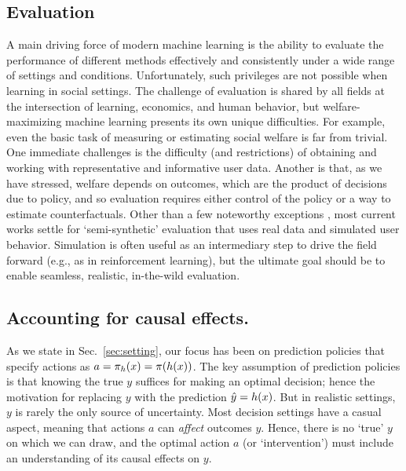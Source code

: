 \subsection{Evaluation}
A main driving force of modern machine learning is the ability to evaluate the performance of different methods effectively and consistently under a wide range of settings and conditions.
Unfortunately, such privileges are not possible when 
learning in social settings.
The challenge of evaluation is shared by all fields at the intersection of learning, economics, and human behavior,
but welfare-maximizing machine learning presents its own unique difficulties.
For example, even the basic task of measuring or estimating social welfare is far from trivial. %
One immediate challenges is the difficulty (and restrictions) of obtaining and working with representative and informative user data.
Another is that, as we have stressed, welfare depends on outcomes, which are the product of decisions due to policy,
and so evaluation requires either control of the policy or a way to estimate counterfactuals.
Other than a few noteworthy exceptions \citep[e.g.,][]{bjorkegren2020manipulation,haupt2023recommending,mendler-dunner2024an},
most current works settle for `semi-synthetic' evaluation that uses real data and simulated user behavior.
Simulation is often useful as an intermediary step to drive the field forward (e.g., as in reinforcement learning),
but the ultimate goal should be to enable seamless, realistic, in-the-wild evaluation.










\subsection{Accounting for causal effects.}  \label{appx:causal}

As we state in Sec.~\ref{sec:setting},
our focus has been on prediction policies \citep{kleinberg2015prediction} that specify actions
as $a = {\pi}_h(x) = {\pi}(h(x))$.
The key assumption of prediction policies is that knowing the true $y$ suffices for making an optimal decision; hence the motivation for replacing $y$ with the prediction ${\hat{y}}=h(x)$.
But in realistic settings, $y$ is rarely the only source of uncertainty.
Most decision settings have a casual aspect,
meaning that actions $a$ can \emph{affect} outcomes $y$.
Hence, there is no `true' $y$ on which we can draw,
and the optimal action $a$ (or `intervention')
must include an understanding of its causal effects on $y$.

